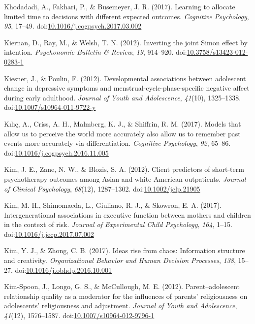 \documentclass[english,man]{apa6}
\theoremstyle{definition}
\theoremstyle{definition}
\theoremstyle{definition}
\theoremstyle{remark}
\begin{document}
\hypertarget{ref-Khodadadi2017}{}
Khodadadi, A., Fakhari, P., \& Busemeyer, J. R. (2017). Learning to
allocate limited time to decisions with different expected outcomes.
\emph{Cognitive Psychology}, \emph{95}, 17--49.
doi:\href{https://doi.org/10.1016/j.cogpsych.2017.03.002}{10.1016/j.cogpsych.2017.03.002}

\hypertarget{ref-Kiernan2012}{}
Kiernan, D., Ray, M., \& Welsh, T. N. (2012). Inverting the joint Simon
effect by intention. \emph{Psychonomic Bulletin \& Review}, \emph{19},
914--920.
doi:\href{https://doi.org/10.3758/s13423-012-0283-1}{10.3758/s13423-012-0283-1}

\hypertarget{ref-Kiesner2012}{}
Kiesner, J., \& Poulin, F. (2012). Developmental associations between
adolescent change in depressive symptoms and
menstrual-cycle-phase-specific negative affect during early adulthood.
\emph{Journal of Youth and Adolescence}, \emph{41}(10), 1325--1338.
doi:\href{https://doi.org/10.1007/s10964-011-9722-y}{10.1007/s10964-011-9722-y}

\hypertarget{ref-Klc2017}{}
Kılıç, A., Criss, A. H., Malmberg, K. J., \& Shiffrin, R. M. (2017).
Models that allow us to perceive the world more accurately also allow us
to remember past events more accurately via differentiation.
\emph{Cognitive Psychology}, \emph{92}, 65--86.
doi:\href{https://doi.org/10.1016/j.cogpsych.2016.11.005}{10.1016/j.cogpsych.2016.11.005}

\hypertarget{ref-Kim2012}{}
Kim, J. E., Zane, N. W., \& Blozis, S. A. (2012). Client predictors of
short-term psychotherapy outcomes among Asian and white American
outpatients. \emph{Journal of Clinical Psychology}, \emph{68}(12),
1287--1302.
doi:\href{https://doi.org/10.1002/jclp.21905}{10.1002/jclp.21905}

\hypertarget{ref-Kim2017}{}
Kim, M. H., Shimomaeda, L., Giuliano, R. J., \& Skowron, E. A. (2017).
Intergenerational associations in executive function between mothers and
children in the context of risk. \emph{Journal of Experimental Child
Psychology}, \emph{164}, 1--15.
doi:\href{https://doi.org/10.1016/j.jecp.2017.07.002}{10.1016/j.jecp.2017.07.002}

\hypertarget{ref-Kim2017a}{}
Kim, Y. J., \& Zhong, C. B. (2017). Ideas rise from chaos: Information
structure and creativity. \emph{Organizational Behavior and Human
Decision Processes}, \emph{138}, 15--27.
doi:\href{https://doi.org/10.1016/j.obhdp.2016.10.001}{10.1016/j.obhdp.2016.10.001}

\hypertarget{ref-Kim-Spoon2012}{}
Kim-Spoon, J., Longo, G. S., \& McCullough, M. E. (2012).
Parent--adolescent relationship quality as a moderator for the
influences of parents' religiousness on adolescents' religiousness and
adjustment. \emph{Journal of Youth and Adolescence}, \emph{41}(12),
1576--1587.
doi:\href{https://doi.org/10.1007/s10964-012-9796-1}{10.1007/s10964-012-9796-1}
\end{document}
